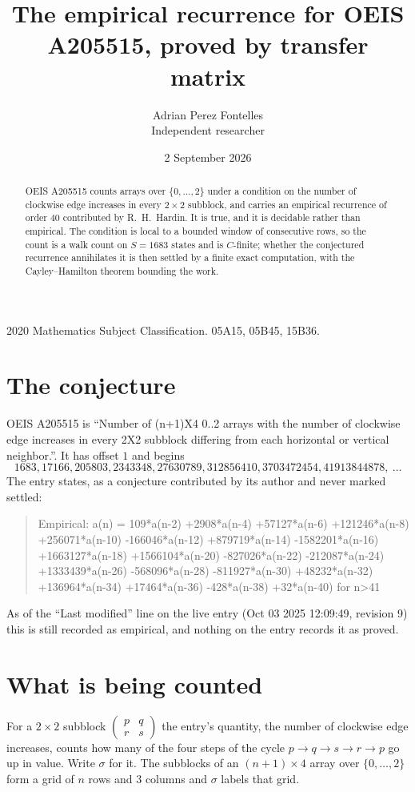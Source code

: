 \documentclass[11pt,a4paper]{article}
\title{The empirical recurrence for OEIS A205515, proved by transfer matrix}
\author{Adrian Perez Fontelles\\ \small Independent researcher}
\date{2 September 2026}
\theoremstyle{plain}
\theoremstyle{definition}
\begin{document}
\maketitle

\begin{abstract}
OEIS A205515 counts arrays over $\{0,\dots,2\}$ under a condition on the number of clockwise edge increases
in every $2\times2$ subblock, and carries an empirical recurrence of order $40$ contributed by
R.~H.~Hardin. It is true, and it is decidable rather than empirical. The condition is local to
a bounded window of consecutive rows, so the count is a walk count on $S=1683$ states and is
$C$-finite; whether the conjectured recurrence annihilates it is then settled by a finite exact
computation, with the Cayley--Hamilton theorem bounding the work.
\end{abstract}

\noindent\small 2020 Mathematics Subject Classification. 05A15, 05B45, 15B36.\normalsize

\section{The conjecture}

OEIS A205515 is ``Number of (n+1)X4 0..2 arrays with the number of clockwise edge increases in every 2X2 subblock differing from each horizontal or vertical neighbor.''. It has offset $1$ and begins
\[
1683, 17166, 205803, 2343348, 27630789, 312856410, 3703472454, 41913844878,\ \dots
\]
The entry states, as a conjecture contributed by its author and never marked settled:
\begin{quote}
Empirical: a(n) = 109*a(n-2) +2908*a(n-4) +57127*a(n-6) +121246*a(n-8) +256071*a(n-10) -166046*a(n-12) +879719*a(n-14) -1582201*a(n-16) +1663127*a(n-18) +1566104*a(n-20) -827026*a(n-22) -212087*a(n-24) +1333439*a(n-26) -568096*a(n-28) -811927*a(n-30) +48232*a(n-32) +136964*a(n-34) +17464*a(n-36) -428*a(n-38) +32*a(n-40) for n>41
\end{quote}
As of the ``Last modified'' line on the live entry (Oct 03 2025 12:09:49, revision 9) this is still
recorded as empirical, and nothing on the entry records it as proved.

\section{What is being counted}

For a $2\times2$ subblock $\begin{pmatrix}p&q\\r&s\end{pmatrix}$ the
entry's quantity, the number of clockwise edge increases, counts how many of the four steps of the cycle $p\to q\to s\to r\to p$ go up in value. Write $\sigma$ for it. The subblocks of an
$(n+1)\times4$ array over $\{0,\dots,2\}$ form a grid of $n$ rows and $3$
columns and $\sigma$ labels that grid.
\end{document}
